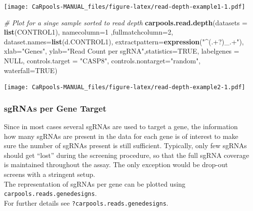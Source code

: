 \documentclass[]{article}
\newenvironment{Shaded}{\begin{snugshade}}{\end{snugshade}}
\newcommand{\KeywordTok}[1]{\textcolor[rgb]{0.13,0.29,0.53}{\textbf{{#1}}}}
\newcommand{\DataTypeTok}[1]{\textcolor[rgb]{0.13,0.29,0.53}{{#1}}}
\newcommand{\DecValTok}[1]{\textcolor[rgb]{0.00,0.00,0.81}{{#1}}}
\newcommand{\StringTok}[1]{\textcolor[rgb]{0.31,0.60,0.02}{{#1}}}
\newcommand{\CommentTok}[1]{\textcolor[rgb]{0.56,0.35,0.01}{\textit{{#1}}}}
\newcommand{\OtherTok}[1]{\textcolor[rgb]{0.56,0.35,0.01}{{#1}}}
\newcommand{\NormalTok}[1]{{#1}}
\begin{document}
\texttt{[image: CaRpools-MANUAL\_files/figure-latex/read-depth-example1-1.pdf]}

\begin{Shaded}
\begin{Highlighting}[]
\CommentTok{# Plot for a singe sample sorted to read depth}
\KeywordTok{carpools.read.depth}\NormalTok{(}\DataTypeTok{datasets =} \KeywordTok{list}\NormalTok{(CONTROL1), }\DataTypeTok{namecolumn=}\DecValTok{1} \NormalTok{,}\DataTypeTok{fullmatchcolumn=}\DecValTok{2}\NormalTok{,}
  \DataTypeTok{dataset.names=}\KeywordTok{list}\NormalTok{(d.CONTROL1), }\DataTypeTok{extractpattern=}\KeywordTok{expression}\NormalTok{(}\StringTok{"^(.+?)_.+"}\NormalTok{),}
  \DataTypeTok{xlab=}\StringTok{"Genes"}\NormalTok{, }\DataTypeTok{ylab=}\StringTok{"Read Count per sgRNA"}\NormalTok{,}\DataTypeTok{statistics=}\OtherTok{TRUE}\NormalTok{, }\DataTypeTok{labelgenes =} \OtherTok{NULL}\NormalTok{,}
  \DataTypeTok{controls.target =} \StringTok{"CASP8"}\NormalTok{, }\DataTypeTok{controls.nontarget=}\StringTok{"random"}\NormalTok{, }\DataTypeTok{waterfall=}\OtherTok{TRUE}\NormalTok{)}
\end{Highlighting}
\end{Shaded}

\texttt{[image: CaRpools-MANUAL\_files/figure-latex/read-depth-example2-1.pdf]}

\subsubsection{sgRNAs per Gene Target}\label{sgrnas-per-gene-target}

Since in most cases several sgRNAs are used to target a gene, the
information how many sgRNAs are present in the data for each gene is of
interest to make sure the number of sgRNAs present is still sufficient.
Typically, only few sgRNAs should get ``lost'' during the screening
procedure, so that the full sgRNA coverage is maintained throughout the
assay. The only exception would be drop-out screens with a stringent
setup.\\
The representation of sgRNAs per gene can be plotted using
\texttt{carpools.reads.genedesigns}.\\
For further details see \texttt{?carpools.reads.genedesigns}.

\begin{Shaded}
\end{Shaded}
\end{document}
